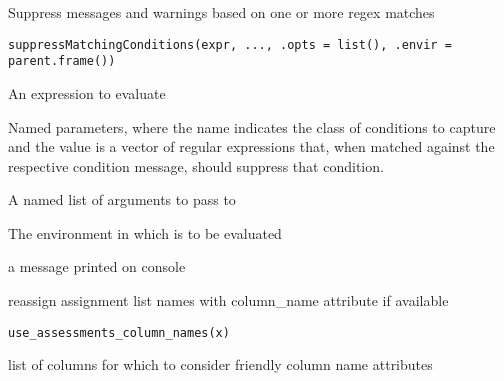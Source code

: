 \documentclass[a4paper]{book}
\begin{document}
%
\begin{Description}
Suppress messages and warnings based on one or more regex matches
\end{Description}
%
\begin{Usage}
\begin{verbatim}
suppressMatchingConditions(expr, ..., .opts = list(), .envir = parent.frame())
\end{verbatim}
\end{Usage}
%
\begin{Arguments}
\begin{ldescription}
\item[\code{expr}] An expression to evaluate

\item[\code{...}] Named parameters, where the name indicates the class of conditions
to capture and the value is a vector of regular expressions that, when
matched against the respective condition message, should suppress that
condition.

\item[\code{.opts}] A named list of arguments to pass to 

\item[\code{.envir}] The environment in which  is to be evaluated
\end{ldescription}
\end{Arguments}
%
\begin{Value}
a message printed on console
\end{Value}
%
\begin{Description}
reassign assignment list names with column\_name attribute if available
\end{Description}
%
\begin{Usage}
\begin{verbatim}
use_assessments_column_names(x)
\end{verbatim}
\end{Usage}
%
\begin{Arguments}
\begin{ldescription}
\item[\code{x}] list of columns for which to consider friendly column name
attributes
\end{ldescription}
\end{Arguments}
\end{document}
